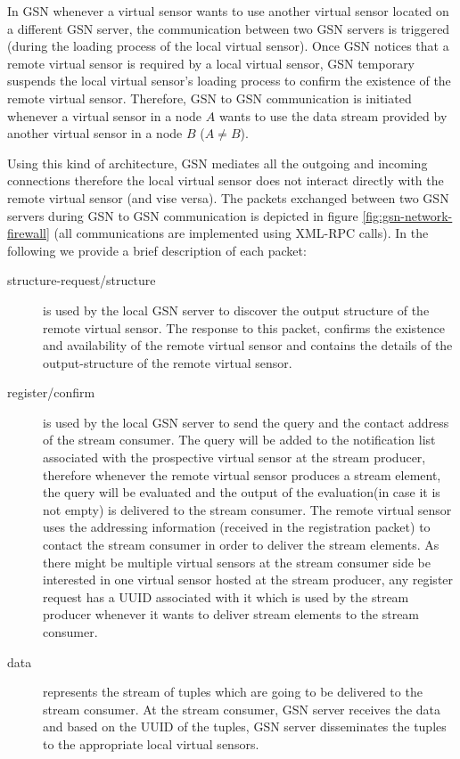 In GSN whenever a virtual sensor wants to use another virtual sensor located on a different GSN server, the 
communication between two GSN servers is triggered (during the loading process of the local virtual sensor).
Once GSN notices that a remote virtual sensor is required by 
a local virtual sensor, GSN temporary suspends the local virtual sensor's loading process to confirm the existence of the remote virtual
sensor. Therefore, GSN to GSN communication is initiated whenever a virtual sensor in a node $A$ wants to use the data stream
provided by another virtual sensor in a node $B$ ($A \neq B$).

Using this kind of architecture, GSN mediates all the outgoing and incoming connections therefore the local virtual sensor
does not interact directly with the remote virtual sensor (and vise versa). The packets exchanged between
two GSN servers during GSN to GSN communication is depicted in figure \ref{fig:gsn-network-firewall} (all communications
are implemented using XML-RPC calls). In the following we provide a brief description of each packet:
\begin{description}
	\item[structure-request/structure] is used by the local GSN server to discover the output structure of the remote virtual sensor. The response
	to this packet, confirms the existence and availability of the remote virtual sensor and contains the details of the  output-structure of the remote virtual
	sensor.	
	\item[register/confirm] is used by the local GSN server to send the query and the contact address of the stream consumer. The query will be added to the notification
	list associated with the prospective virtual sensor at the stream producer, therefore whenever the remote virtual sensor produces a stream element, the query
	will be evaluated and the output of the evaluation(in case it is not empty) is delivered to the stream consumer.
	The remote virtual sensor uses the addressing information (received in the registration packet) to contact the stream consumer in order to
	deliver the stream elements. As there might be multiple virtual sensors at the stream consumer side be interested in one virtual sensor hosted
	at the stream producer, any register request has a UUID associated with it which is used by the stream producer whenever it wants to deliver stream elements 
	to the stream consumer.
	\item[data] represents the stream of tuples which are going to be delivered to the stream consumer. At the stream consumer, GSN server receives the data and based
	on the UUID of the tuples, GSN server disseminates the tuples to the appropriate local virtual sensors.
\end{description}


